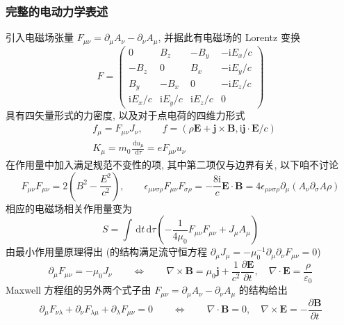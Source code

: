 \documentclass[12pt,a4paper]{article}%
\numberwithin{equation}{section}%
\renewcommand*{\vec}[1]{\bm{#1}}%
\newcommand{\dif}{\,\mathrm d}
\newcommand\mi{\mathrm{i}}
\begin{document}
\subsubsection{完整的电动力学表述} %
\label{ssub:all_elemag_in_action}
引入电磁场张量 $F_{\mu\nu} = \partial_\mu A_\nu - \partial_\nu A_\mu$, 并据此有电磁场的 Lorentz 变换
\begin{equation}
    F = \begin{pmatrix}
        0         &  B_z       & -B_y       & -\mi E_x/c \\
       -B_z       &  0         &  B_x       & -\mi E_y/c \\
        B_y       & -B_x       &  0         & -\mi E_z/c \\
       \mi E_x/c & \mi E_y/c & \mi E_z/c & 0          
    \end{pmatrix}
\end{equation}
具有四矢量形式的力密度, 以及对于点电荷的四维力形式
\begin{align}
    &f_\mu = F_{\mu\nu}J_\nu,\qquad f = (\rho\vec E + \vec j\times\vec B, \mi\vec j\cdot\vec E/c) \\
    &K_\mu = m_0\frac{\dif u_\mu}{\dif\tau} = eF_{\mu\nu}u_\nu
\end{align}
在作用量中加入满足规范不变性的项, 其中第二项仅与边界有关, 以下咱不讨论
\begin{equation}\label{equ:field_in_action}
    F_{\mu\nu}F_{\mu\nu} = 2\left(B^2 - \frac{E^2}{c^2}\right), \qquad
    \epsilon_{\mu\nu\sigma\rho} F_{\mu\nu} F_{\sigma\rho} 
    = -\frac{8\mi}c \vec E\cdot\vec B 
    = 4\epsilon_{\mu\nu\sigma\rho}\partial_\mu(A_\nu\partial_\sigma A\rho)
\end{equation}
相应的电磁场相关作用量变为
\begin{equation}
    S = \int\dif t\dif\tau \left(-\frac 1{4\mu_0}F_{\mu\nu}F_{\mu\nu} + J_\mu A_\mu\right)
\end{equation}
由最小作用量原理得出 (的结构满足流守恒方程 $\partial_\mu J_\mu = -\mu_0^{-1}\partial_\mu\partial_\nu F_{\mu\nu} = 0$)
\begin{equation}
    \partial_\mu F_{\mu\nu} = -\mu_0 J_\nu \qquad\Longleftrightarrow\qquad
    \nabla\times\vec B = \mu_0\vec j + \frac 1{c^2}\frac{\partial\vec E}{\partial t},
    \quad \nabla\cdot\vec E = \frac{\rho}{\varepsilon_0}
\end{equation}
Maxwell 方程组的另外两个式子由 $F_{\mu\nu} = \partial_\mu A_\nu - \partial_\nu A_\mu$ 的结构给出
\begin{equation}
    \partial_\mu F_{\nu\lambda} + \partial_\nu F_{\lambda\mu} + \partial_\lambda F_{\mu\nu} = 0 \qquad \Longleftrightarrow \qquad 
    \nabla\cdot\vec B = 0, \quad 
    \nabla\times\vec E = -\frac{\partial\vec B}{\partial t}
\end{equation}
\end{document}
